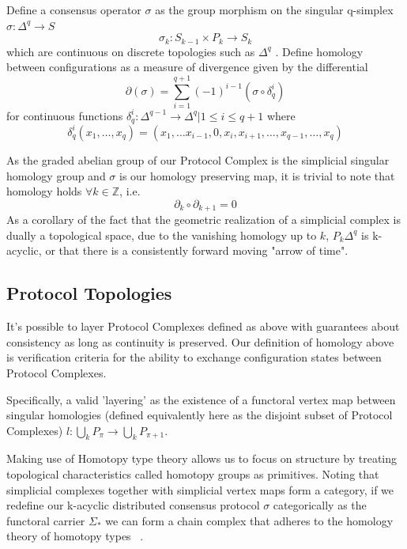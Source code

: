 \documentclass[runningheads]{llncs}
\begin{document}
Define a consensus operator $\sigma$ as the group morphism on the singular q-simplex $\sigma: \Delta^q \rightarrow S$ 
\begin{equation} \label{eq1}
\sigma_k: S_{k-1} \times P_k \rightarrow S_{k}
\end{equation} \label{eq1}
which are continuous on discrete topologies such as $\Delta^q$ \cite{ref_article1}. Define homology between configurations as a measure of divergence given by the differential 
\begin{equation} 
\partial(\sigma) = \sum^{q+1}_{i=1} (-1)^{i-1}(\sigma \circ \delta_q^{i} )
\end{equation}
for continuous functions $\delta^{i}_q: \Delta^{q-1} \rightarrow \Delta^q | 1 \leq i \leq q+1$ where 
\begin{equation}
\delta^{i}_q(x_1, \dots, x_q) = (x_1, \dots x_{i-1}, 0, x_i, x_{i+1}, \dots, x_{q-1}, \dots, x_q)
\end{equation}

As the graded abelian group of our Protocol Complex is the simplicial singular homology group and $\sigma$ is our homology preserving map, it is trivial to note that homology holds $\forall k \in \mathbb{Z}$, i.e.
\begin{equation} \label{eq1}
\partial_k \circ \partial_{k+1} = 0
\end{equation} \label{eq1}
As a corollary of the fact that the geometric realization of a simplicial complex is dually a topological space, due to the vanishing homology up to $k$, $P_k\Delta^q$ is k-acyclic, or that there is a consistently forward moving "arrow of time".

\subsection{Protocol Topologies}
It's possible to layer Protocol Complexes defined as above with guarantees about consistency as long as continuity is preserved. Our definition of homology above is verification criteria for the ability to exchange configuration states between Protocol Complexes.

Specifically, a valid 'layering' as the existence of a functoral vertex map between singular homologies (defined equivalently here as the disjoint subset of Protocol Complexes) $l: \bigcup_{k} P_{\pi} \rightarrow \bigcup_{k} P_{\pi+1}$.

Making use of Homotopy type theory allows us to focus on structure by treating topological characteristics called homotopy groups as primitives. Noting that simplicial complexes together with simplicial vertex maps form a category, if we redefine our k-acyclic distributed consensus protocol $\sigma$ categorically as the functoral carrier $\Sigma_{*}$  we can form a chain complex that adheres to the homology theory of homotopy types ~\cite{ref_article5}.
\end{document}
